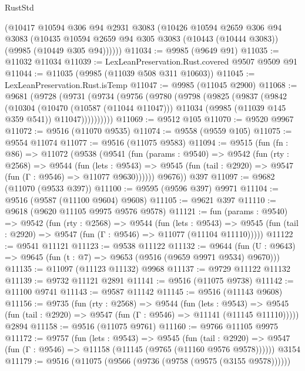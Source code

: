 \begin{lexlean}{RustStd}
\begin{coremodule}
      (@10417
        @10594
        @306
        @94
        @2931
        @3083
        (@10426
          @10594
          @2659
          @306
          @94
          @3083
          (@10435 @10594 @2659 @94 @305 @3083 (@10443 (@10444 @3083)) (@9985 (@10449 @305 @94))))))
@11034 := @9985 (@9649 @91)
@11035 := @11032 @11034
@11039 := LexLeanPreservation.Rust.covered @9507 @9509 @91
@11044 := @11035 (@9985 (@11039 @508 @311 @10603))
@11045 := LexLeanPreservation.Rust.isTemp
@11047 := @9985 (@11045 @2900)
@11068 := @9681
    (@9728
      (@9731
        (@9734
          (@9756
            (@9780
              (@9798
                (@9825
                  (@9837
                    (@9842
                      (@10304
                        (@10470 (@10587 (@11044 @11047)))
                        @11034
                        (@9985 (@11039 @145 @359 @541))
                        @11047))))))))))
@11069 := @9512 @105
@11070 := @9520 @9967
@11072 := @9516 (@11070 @9535)
@11074 := @9558 (@9559 @105)
@11075 := @9554 @11074
@11077 := @9516 (@11075 @9583)
@11094 := @9515
    (fun (fn : @86) =>
    @11072
      (@9538
        (@9541
          (fun (params : @9540) =>
          @9542
            (fun (rty : @2568) =>
            @9544
              (fun (lets : @9543) =>
              @9545 (fun (tail : @2920) => @9547 (fun (Γ : @9546) => @11077 @9630))))))
        @9676))
    @397
@11097 := @9682 (@11070 (@9533 @397))
@11100 := @9595 (@9596 @397) @9971
@11104 := @9516 (@9587 (@11100 @9604) @9608)
@11105 := @9621 @397
@11110 := @9618 (@9620 @11105 @9975 @9576 @9578)
@11121 := fun (params : @9540) =>
  @9542
    (fun (rty : @2568) =>
    @9544
      (fun (lets : @9543) =>
      @9545 (fun (tail : @2920) => @9547 (fun (Γ : @9546) => @11077 (@11104 @11110)))))
@11122 := @9541 @11121
@11123 := @9538 @11122
@11132 := @9644 (fun (U : @9643) => @9645 (fun (t : @7) => @9653 (@9516 (@9659 @9971 @9534) @9670)))
@11135 := @11097 (@11123 @11132) @9968
@11137 := @9729 @11122 @11132
@11139 := @9732 @11121 @2891
@11141 := @9516 (@11075 @9738)
@11142 := @11100 @9741
@11143 := @9587 @11142
@11145 := @9516 (@11143 @9608)
@11156 := @9735
    (fun (rty : @2568) =>
    @9544
      (fun (lets : @9543) =>
      @9545 (fun (tail : @2920) => @9547 (fun (Γ : @9546) => @11141 (@11145 @11110)))))
    @2894
@11158 := @9516 (@11075 @9761)
@11160 := @9766 @11105 @9975
@11172 := @9757
    (fun (lets : @9543) =>
    @9545
      (fun (tail : @2920) =>
      @9547 (fun (Γ : @9546) => @11158 (@11145 (@9765 (@11160 @9576 @9578))))))
    @3154
@11179 := @9516 (@11075 (@9566 (@9736 (@9758 (@9575 (@3155 @9578))))))

\end{coremodule}
\end{lexlean}
